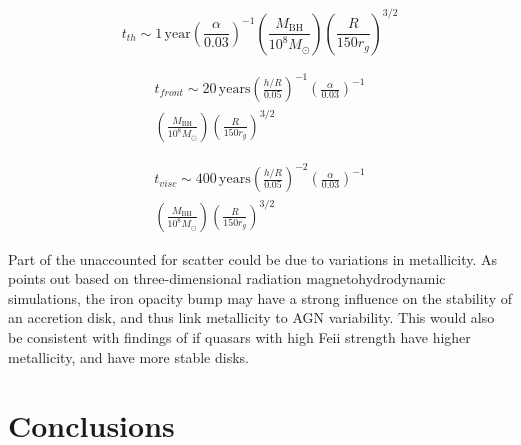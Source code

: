 \documentclass[twocolumn]{aastex62}
\begin{document}
 \begin{equation}
 t_{th}   \sim 1 \,\mathrm{year} \left( \frac{\alpha}{0.03}\right)^{-1}  
 \left( \frac{M_{\mathrm{BH}}}{10^{8} M_{\odot}}\right) \left( \frac{R}{150 r_{g}}\right)^{3/2} 
 \end{equation}

  \begin{eqnarray}
  t_{front} \sim 20 \,\mathrm{years} \left( \frac{h/R}{0.05}\right)^{-1}   \left( \frac{\alpha}{0.03}\right)^{-1}  \nonumber  \\ 
  \left( \frac{M_{\mathrm{BH}}}{10^{8} M_{\odot}}\right)     \left( \frac{R}{150 r_{g}}\right) ^{3/2} 
 \end{eqnarray}

  \begin{eqnarray}
  t_{visc}  \sim 400 \, \mathrm{years} \left( \frac{h/R}{0.05}\right)^{-2}   \left( \frac{\alpha}{0.03}\right)^{-1} \nonumber  \\  
  \left(\frac{M_{\mathrm{BH}}}{10^{8} M_{\odot}} \right)     \left( \frac{R}{150 r_{g}}\right) ^{3/2}  
 \end{eqnarray}





Part of the unaccounted for scatter could be due to variations in metallicity.  As \cite{jiang2016} points out based on three-dimensional radiation magnetohydrodynamic simulations, the iron opacity bump may have a strong influence on the stability of an accretion disk, and thus link metallicity to AGN variability. This would also be consistent with findings of \cite{sun2018} if quasars with high  Fe{\sc ii} strength have higher metallicity, and have more stable disks. 







%
%
%
%
%
%

\section{Conclusions}\label{sec:conclusions}





 


\end{document}
